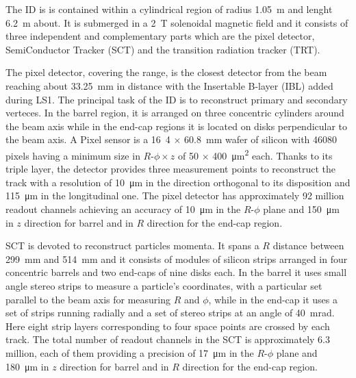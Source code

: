 The ID is is contained within a cylindrical region of radius \SI{1.05}{\m} and lenght \SI{6.2}{\m} about. It is submerged in a \SI{2}{\tesla} solenoidal magnetic field and it consists of three independent and complementary parts which are the pixel detector, SemiConductor Tracker (SCT) and the transition radiation tracker (TRT).

The pixel detector, covering the  range, is the closest detector from the beam reaching about \SI{33.25}{\mm} in distance with the Insertable B-layer (IBL) added during LS1. The principal task of the ID is to reconstruct primary and secondary verteces. In the barrel region, it is arranged on three concentric cylinders around the beam axis while in the end-cap regions it is located on disks perpendicular to the beam axis. A Pixel sensor is a \si{16.4} $\times$ \SI{60.8}{\mm} wafer of silicon with \num{46080} pixels having a minimum size in $R$-$\phi \times z$ of  \si{50} $\times$ \SI{400}{\um\squared} each. Thanks to its triple layer, the detector provides three measurement points to reconstruct the track with a resolution of \SI{10}{\um} in the direction orthogonal to its disposition and \SI{115}{\um} in the longitudinal one. The pixel detector has approximately \num{92} million readout channels achieving an accuracy of \SI{10}{\um} in the $R$-$\phi$ plane and \SI{150}{\um} in $z$ direction for barrel and in $R$ direction for the end-cap region.

SCT is devoted to reconstruct particles momenta. It spans a $R$ distance between \SI{299}{\mm} and \SI{514}{\mm} and it consists of modules of silicon strips arranged in four concentric barrels and two end-caps of nine disks each. In the barrel it uses small angle stereo strips to measure a particle's coordinates, with a particular set parallel to the beam axis for measuring $R$ and $\phi$, while in the end-cap it uses a set of strips running radially and a set of stereo strips at an angle of \SI{40}{mrad}. Here eight strip layers corresponding to four space points are crossed by each track. The total number of readout channels in the SCT is approximately 6.3 million, each of them providing a precision of \SI{17}{\um} in the $R$-$\phi$ plane and \SI{180}{\um} in $z$ direction for barrel and in $R$ direction for the end-cap region.

